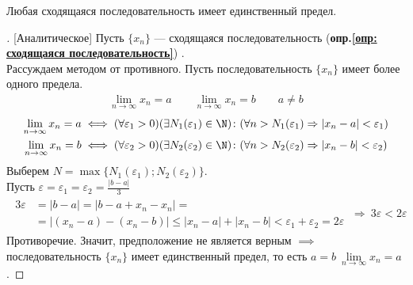 \begin{theorem}
  Любая сходящаяся последовательность имеет единственный предел.
\end{theorem}
\begin{proof}[][Аналитическое]
  Пусть $\{x_{n}\} $ --- сходящаяся последовательность (\textbf{опр.\ref{опр: сходящаяся последовательность}}) . \\
  Рассуждаем методом от противного. Пусть последовательность $\{x_{n}\} $ имеет более одного предела. \vspace{-\topsep}
  \begin{gather*}
    \lim_{n \to \infty} x_n = a \qquad \lim_{n \to \infty} x_n = b \qquad a \neq b 
  \end{gather*} \vspace{-2\topsep}
  \begin{gather}
    \lim_{n \to \infty} x_n = a \iff (\forall \varepsilon_1 > 0)(\exists N_1(\varepsilon_1) \in \N)\colon (\forall n > N_1(\varepsilon_1) \Rightarrow |x_{n} - a| < \varepsilon_1) \\
    \lim_{n \to \infty} x_n = b \iff (\forall \varepsilon_2 > 0)(\exists N_2(\varepsilon_2) \in \N)\colon (\forall n > N_2(\varepsilon_2) \Rightarrow |x_{n} - b| < \varepsilon_2)  
  \end{gather} 
  Выберем $N= \max \{N_1\left( \varepsilon_1 \right); N_2\left( \varepsilon_2 \right) \}$. \\[1ex]
  Пусть $\displaystyle \varepsilon = \varepsilon_1 = \varepsilon_2 = \frac{|b - a|}{3}$
  \begin{gather*}
    \begin{aligned}
      3 \varepsilon &= |b - a| = |b - a + x_{n} - x_{n}| = \\
      &= |(x_{n} - a) - (x_{n} - b)| \le |x_{n} - a| + |x_{n} - b| < \varepsilon_1 + \varepsilon_2 = 2 \varepsilon
    \end{aligned}\ \Rightarrow\ 3 \varepsilon < 2 \varepsilon
  \end{gather*}
  Противоречие. Значит, предположение не является верным $\implies$ последовательность $\{x_{n}\}$ имеет единственный предел, то есть $a=b\ \lim\limits_{n \to \infty} x_n = a$.
\end{proof}

